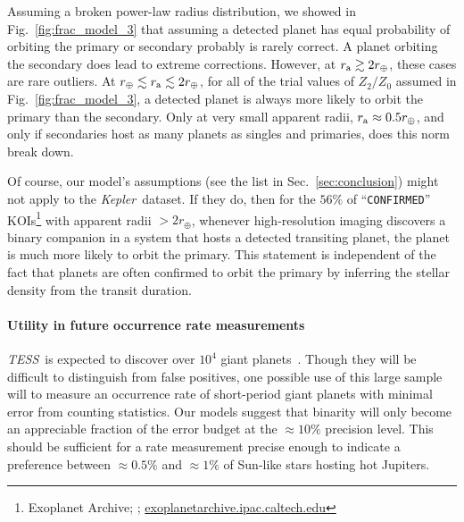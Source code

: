 \documentclass[12pt,modern]{aastex61}
\renewcommand{\a}{_{\rm a}}
\begin{document}
Assuming a broken power-law radius distribution, we showed in 
Fig.~\ref{fig:frac_model_3} that assuming a detected planet has equal 
probability of orbiting the primary or secondary probably is rarely correct.
A planet orbiting the secondary does lead to extreme corrections.
However, at $r\a \gtrsim 2r_\oplus$, these cases are rare outliers.
At $r_\oplus \lesssim r\a \lesssim 2r_\oplus$, for all of the trial values of 
$Z_2/Z_0$ assumed in Fig.~\ref{fig:frac_model_3}, a detected planet is always 
more likely to orbit the primary than the secondary.
Only at very small apparent radii, $r\a \approx 0.5r_\oplus$, and only if 
secondaries host as many planets as singles and primaries, does this norm 
break down.

Of course, our model's assumptions (see the list in Sec.~\ref{sec:conclusion}) 
might not apply to the {\it Kepler}\ dataset.
If they do, then for the $56\%$ of ``\texttt{CONFIRMED}'' 
KOIs\footnote{Exoplanet Archive; \cite{akeson_nasa_2013}; 
\url{exoplanetarchive.ipac.caltech.edu}} with 
apparent radii $>2r_\oplus$, 
whenever high-resolution imaging 
discovers a binary companion in 
a system that hosts a detected transiting planet, the planet is much
more likely to orbit the primary.
This statement is independent of the fact that planets are often confirmed to 
orbit the primary by inferring the stellar density from the transit duration.


\paragraph{Utility in future occurrence rate measurements}
{\it TESS}\ is expected to discover over $10^4$ giant 
planets~\citep{ricker_transiting_2014,sullivan_transiting_2015}.
Though they will be difficult to distinguish from false positives, one 
possible use of this large sample will to measure an occurrence rate of 
short-period giant planets with minimal error from counting statistics.
Our models suggest that binarity will only become an appreciable fraction of 
the error budget at the $\approx 10\%$ precision level.
This should be sufficient for a rate measurement precise enough to indicate a 
preference between $\approx 0.5\%$ and $\approx 1\%$ of Sun-like stars hosting 
hot Jupiters.

\end{document}
